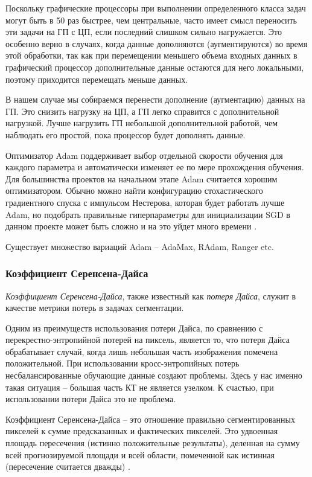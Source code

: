 \documentclass[%
	11pt,
	a4paper,
	utf8,
		]{article}
\begin{document}
Поскольку графические процессоры при выполнении определенного класса задач могут быть в 50 раз быстрее, чем центральные, часто имеет смысл переносить эти задачи на ГП с ЦП, если последний слишком сильно нагружается. Это особенно верно в случаях, когда данные дополняются (аугментируются) во время этой обработки, так как при перемещении меньшего объема входных данных в графический процессор дополнительные данные остаются для него локальными, поэтому приходится перемещать меньше данных.

В нашем случае мы собираемся перенести дополнение (аугментацию) данных на ГП. Это снизить нагрузку на ЦП, а ГП легко справится с дополнительной нагрузкой. Лучше нагрузить ГП небольшой дополнительной работой, чем наблюдать его простой, пока процессор будет дополнять данные.

Оптимизатор Adam поддерживает выбор отдельной скорости обучения для каждого параметра и автоматически изменяет ее по мере прохождения обучения. Для большинства проектов на начальном этапе Adam считается хорошим оптимизатором. Обычно можно найти конфигурацию стохастического градиентного спуска с импульсом Нестерова, которая будет работать лучше Adam, но подобрать правильные гиперпараметры для инициализации SGD в данном проекте может быть сложно и на это уйдет много времени \cite[]{pytorch-2022}.

Существует множество вариаций Adam -- AdaMax, RAdam, Ranger etc.

\subsubsection{Коэффициент Серенсена-Дайса}

\emph{Коэффициент Серенсена-Дайса}, также известный как \emph{потеря Дайса}, служит в качестве метрики потерь в задачах сегментации. 

Одним из преимуществ использования потери Дайса, по сравнению с перекрестно-энтропийной потерей на пиксель, является то, что потеря Дайса обрабатывает случай, когда лишь небольшая часть изображения помечена положительной. При использовании кросс-энтропийных потерь несбалансированные обучающие данные создают проблемы. Здесь у нас именно такая ситуация -- большая часть КТ не является узелком. К счастью, при использовании потери Дайса это не проблема.

Коэффициент Серенсена-Дайса -- это отношение правильно сегментированных пикселей к сумме предсказанных и фактических пикселей. Это удвоенная площадь пересечения (истинно положительные результаты), деленная на сумму всей прогнозируемой площади и всей области, помеченной как истинная (пересечение считается дважды) \cite[]{pytorch-2022}.
\end{document}
